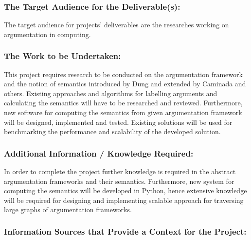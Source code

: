 \documentclass{article}
\begin{document}
\bigskip

\subsubsection{The Target Audience for the Deliverable(s):}
The target audience for projects' deliverables are the researches working on argumentation in computing.


\bigskip

\subsubsection{The Work to be Undertaken:}
This project requires research to be conducted on the argumentation framework and the notion of semantics introduced by Dung and extended by Caminada and others. Existing approaches and algorithms for labelling arguments and calculating the semantics will have to be researched and reviewed. Furthermore, new software for computing the semantics from given argumentation framework will be designed, implemented and tested. Existing solutions will be used for benchmarking the performance and scalability of the developed solution.


\bigskip

\subsubsection{Additional Information / Knowledge Required:}
In order to complete the project further knowledge is required in the abstract argumentation frameworks and their semantics. Furthermore, new system for computing the semantics will be developed in Python, hence extensive knowledge will be required for designing and implementing scalable approach for traversing large graphs of argumentation frameworks. 


\bigskip

\subsubsection{Information Sources that Provide a Context for the Project:}
\end{document}

